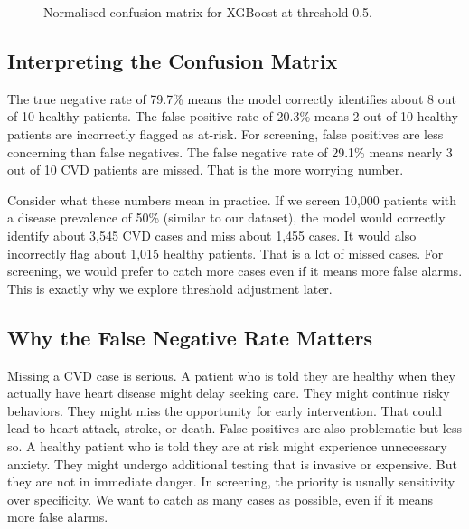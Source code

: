 \documentclass[12pt, a4paper, oneside]{book}
\begin{document}
\begin{figure}[H]
\centering
\vspace{12pt}
\renewcommand{\arraystretch}{1.4}
\setlength{\tabcolsep}{10pt}
\scriptsize
{}%
\vspace{12pt}
\caption{Normalised confusion matrix for XGBoost at threshold 0.5.}
\label{fig:confusion_xgboost}
\end{figure}

\subsection{Interpreting the Confusion Matrix}
The true negative rate of 79.7\% means the model correctly identifies about 8 out of 10 healthy patients. The false positive rate of 20.3\% means 2 out of 10 healthy patients are incorrectly flagged as at-risk. For screening, false positives are less concerning than false negatives. The false negative rate of 29.1\% means nearly 3 out of 10 CVD patients are missed. That is the more worrying number.

Consider what these numbers mean in practice. If we screen 10,000 patients with a disease prevalence of 50\% (similar to our dataset), the model would correctly identify about 3,545 CVD cases and miss about 1,455 cases. It would also incorrectly flag about 1,015 healthy patients. That is a lot of missed cases. For screening, we would prefer to catch more cases even if it means more false alarms. This is exactly why we explore threshold adjustment later.

\subsection{Why the False Negative Rate Matters}
Missing a CVD case is serious. A patient who is told they are healthy when they actually have heart disease might delay seeking care. They might continue risky behaviors. They might miss the opportunity for early intervention. That could lead to heart attack, stroke, or death. False positives are also problematic but less so. A healthy patient who is told they are at risk might experience unnecessary anxiety. They might undergo additional testing that is invasive or expensive. But they are not in immediate danger. In screening, the priority is usually sensitivity over specificity. We want to catch as many cases as possible, even if it means more false alarms.
\end{document}
